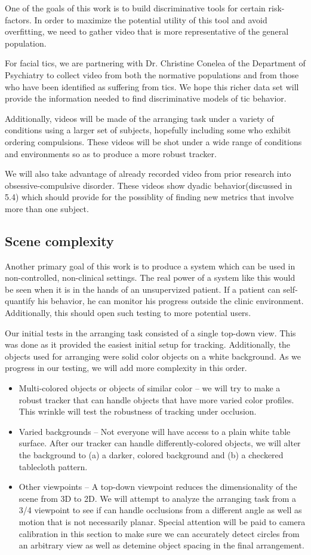 \documentclass[11pt]{article}
\begin{document}
One of the goals of this work is to build discriminative tools for certain risk-factors. In order to maximize the potential utility of this tool and avoid overfitting, we need to gather video that is more representative of the general population.

For facial tics, we are partnering with Dr. Christine Conelea of the Department of Psychiatry to collect video from both the normative populations and from those who have been identified as suffering from tics. We hope this richer data set will provide the information needed to find discriminative models of tic behavior.

Additionally, videos will be made of the arranging task under a variety of conditions using a larger set of subjects, hopefully including some who exhibit ordering compulsions. These videos will be shot under a wide range of conditions and environments so as to produce a more robust tracker.

We will also take advantage of already recorded video from prior research into obsessive-compulsive disorder. These videos show dyadic behavior(discussed in 5.4) which should provide for the possiblity of finding new metrics that involve more than one subject.
\subsection{Scene complexity}
Another primary goal of this work is to produce a system which can be used in non-controlled, non-clinical settings. The real power of a system like this would be seen when it is in the hands of an unsupervized patient. If a patient can self-quantify his behavior, he can monitor his progress outside the clinic environment. Additionally, this should open such testing to more potential users.

Our initial tests in the arranging task consisted of a single top-down view. This was done as it provided the easiest initial setup for tracking. Additionally, the objects used for arranging were solid color objects on a white background. As we progress in our testing, we will add more complexity in this order.
\begin{itemize}
	\item{Multi-colored objects or objects of similar color -- we will try to make a robust tracker that can handle objects that have more varied color profiles. This wrinkle will test the robustness of tracking under occlusion.}
	\item{Varied backgrounds -- Not everyone will have access to a plain white table surface. After our tracker can handle differently-colored objects, we will alter the background to (a) a darker, colored background and (b) a checkered tablecloth pattern.}
	\item{Other viewpoints -- A top-down viewpoint reduces the dimensionality of the scene from 3D to 2D. We will attempt to analyze the arranging task from a 3/4 viewpoint to see if can handle occlusions from a different angle as well as motion that is not necessarily planar. Special attention will be paid to camera calibration in this section to make sure we can accurately detect circles from an arbitrary view as well as detemine object spacing in the final arrangement.}
\end{itemize}
\end{document}
